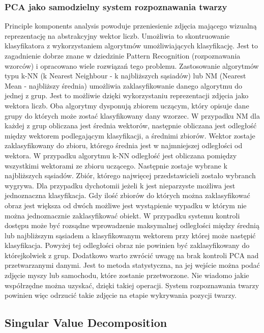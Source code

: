 \documentclass{article}
\begin{document}
\subsubsection{PCA jako samodzielny system rozpoznawania twarzy}
Principle komponents analysis powoduje przeniesienie zdjęcia mającego wizualną reprezentację na abstrakcyjny wektor liczb. Umożliwia to skontruowanie klasyfikatora z wykorzystaniem algorytmów umożliwiających klasyfikację. Jest to zagadnienie dobrze znane w dziedzinie Pattern Recognition (rozpoznawania wzorców) i opracowano wiele rozwiązań tego problemu. Zastosowanie algorytmów typu k-NN (k Nearest Neighbour - k najbliższych sąsiadów) lub NM (Nearest Mean - najbliższy średnia) umożliwia zaklasyfikowanie danego algorytmu do jednej z grup. Jest to możliwie dzięki wykorzystaniu reprezentacji zdjęcia jako wektora liczb. Oba algorytmy dysponują zbiorem uczącym, który opisuje dane grupy do których może zostać klasyfikowany dany wzorzec. 
W przypadku NM dla każdej z grup obliczana jest średnia wektorów, następnie obliczana jest odległość między wektorem podlegającym klasyfikacji, a średnimi zbiorów. Wektor zostaje zaklasyfikowany do zbioru, którego średnia jest w najmniejszej odległości od wektora. 
W przypadku algorytmu k-NN odległość jest obliczana pomiędzy wszystkimi wektorami ze zbioru uczącego. Następnie zostaje wybrane k najbliższych sąsiadów. Zbiór, którego najwięcej przedstawicieli zostało wybranch wygrywa. Dla przypadku dychotomii jeżeli k jest nieparzyste możliwa jest jednoznaczna klasyfikacja. Gdy ilość zbiorów do których można zaklasyfikować obraz jest większa od dwóch możliwe jest wystąpienie wypadku w którym nie można jednoznacznie zaklasyfikować obiekt. 
W przypadku systemu kontroli dostępu może być rozsądne wprowadzenie maksymalnej odległości między średnią lub najbliższym sąsiadem a klasyfikowanym wektorem przy której może następić klasyfikacja. Powyżej tej odległości obraz nie powinien być zaklasyfikowany do którejkolwiek z grup. 
Dodatkowo warto zwrócić uwagę na brak kontroli PCA nad przetwarzanymi danymi. Jest to metoda statystyczna, na jej wejście można podać zdjęcie myszy lub samochodu, które zostanie przetworzone. Nie wiadomo jakie współrzędne można uzyskać, dzięki takiej operacji. System rozpoznawania twarzy powinien więc odrzucić takie zdjęcie na etapie wykrywania pozycji twarzy.


\subsection{Singular Value Decomposition}
\end{document}
